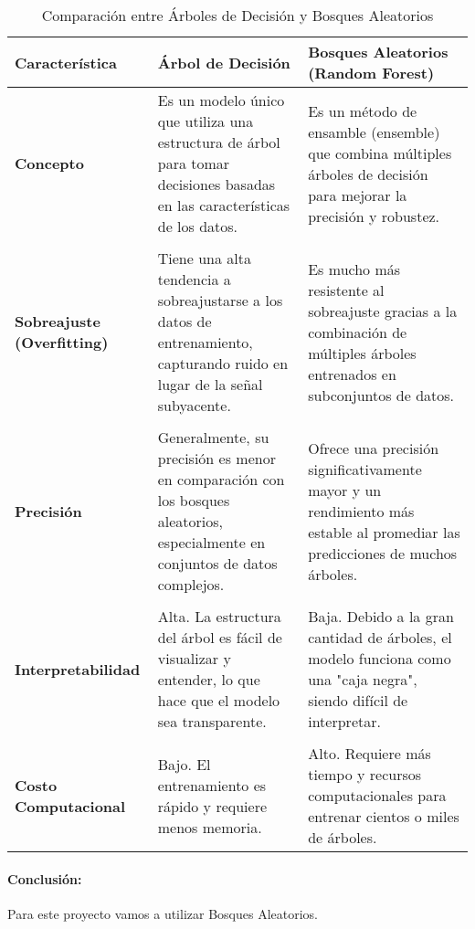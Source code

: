 \begin{table}[h!]
\centering
\caption{Comparación entre Árboles de Decisión y Bosques Aleatorios}
\label{tab:decision_tree_vs_random_forest}
\begin{tabularx}{\textwidth}{@{} l X X @{}}
\toprule
\textbf{Característica} & \textbf{Árbol de Decisión} & \textbf{Bosques Aleatorios (Random Forest)} \\
\midrule
\textbf{Concepto} & Es un modelo único que utiliza una estructura de árbol para tomar decisiones basadas en las características de los datos. & Es un método de ensamble (ensemble) que combina múltiples árboles de decisión para mejorar la precisión y robustez. \\
\\
\textbf{Sobreajuste (Overfitting)} & Tiene una alta tendencia a sobreajustarse a los datos de entrenamiento, capturando ruido en lugar de la señal subyacente. & Es mucho más resistente al sobreajuste gracias a la combinación de múltiples árboles entrenados en subconjuntos de datos. \\
\\
\textbf{Precisión} & Generalmente, su precisión es menor en comparación con los bosques aleatorios, especialmente en conjuntos de datos complejos. & Ofrece una precisión significativamente mayor y un rendimiento más estable al promediar las predicciones de muchos árboles. \\
\\
\textbf{Interpretabilidad} & Alta. La estructura del árbol es fácil de visualizar y entender, lo que hace que el modelo sea transparente. & Baja. Debido a la gran cantidad de árboles, el modelo funciona como una "caja negra", siendo difícil de interpretar. \\
\\
\textbf{Costo Computacional} & Bajo. El entrenamiento es rápido y requiere menos memoria. & Alto. Requiere más tiempo y recursos computacionales para entrenar cientos o miles de árboles. \\
\bottomrule
\end{tabularx}
\end{table}

\paragraph{Conclusión:}
Para este proyecto vamos a utilizar Bosques Aleatorios.
